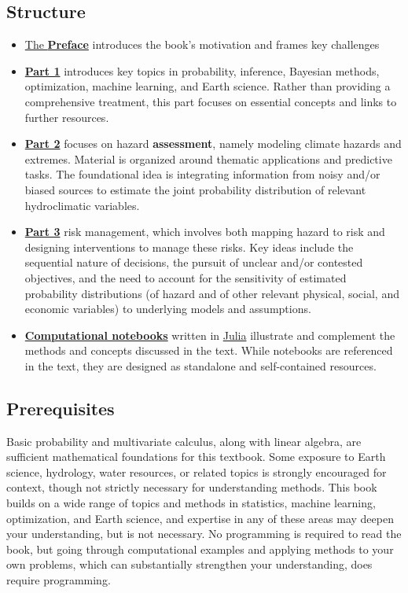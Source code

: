 \documentclass[
  letterpaper,
  DIV=11,
  numbers=noendperiod]{scrreprt}
\providecommand{\tightlist}{%
  \setlength{\itemsep}{0pt}\setlength{\parskip}{0pt}}
\begin{document}
\subsection*{Structure}\label{structure}

\begin{itemize}
\tightlist
\item
  \href{./chapters/preface.qmd}{The \textbf{Preface}} introduces the
  book's motivation and frames key challenges
\item
  \href{./chapters/fundamentals/index.qmd}{\textbf{Part 1}} introduces
  key topics in probability, inference, Bayesian methods, optimization,
  machine learning, and Earth science. Rather than providing a
  comprehensive treatment, this part focuses on essential concepts and
  links to further resources.
\item
  \href{./chapters/hazard/index.qmd}{\textbf{Part 2}} focuses on hazard
  \textbf{assessment}, namely modeling climate hazards and extremes.
  Material is organized around thematic applications and predictive
  tasks. The foundational idea is integrating information from noisy
  and/or biased sources to estimate the joint probability distribution
  of relevant hydroclimatic variables.
\item
  \href{./chapters/risk/index.qmd}{\textbf{Part 3}} risk management,
  which involves both mapping hazard to risk and designing interventions
  to manage these risks. Key ideas include the sequential nature of
  decisions, the pursuit of unclear and/or contested objectives, and the
  need to account for the sensitivity of estimated probability
  distributions (of hazard and of other relevant physical, social, and
  economic variables) to underlying models and assumptions.
\item
  \href{./notebooks/index.qmd}{\textbf{Computational notebooks}} written
  in \href{https://julialang.org/}{Julia} illustrate and complement the
  methods and concepts discussed in the text. While notebooks are
  referenced in the text, they are designed as standalone and
  self-contained resources.
\end{itemize}

\subsection*{Prerequisites}\label{prerequisites}

Basic probability and multivariate calculus, along with linear algebra,
are sufficient mathematical foundations for this textbook. Some exposure
to Earth science, hydrology, water resources, or related topics is
strongly encouraged for context, though not strictly necessary for
understanding methods. This book builds on a wide range of topics and
methods in statistics, machine learning, optimization, and Earth
science, and expertise in any of these areas may deepen your
understanding, but is not necessary. No programming is required to read
the book, but going through computational examples and applying methods
to your own problems, which can substantially strengthen your
understanding, does require programming.
\end{document}
